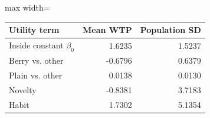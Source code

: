 \begin{adjustbox}{max width=\linewidth}
\begin{tabular}{lrr}\toprule
Utility term & Mean WTP & Population SD\\\midrule
Inside constant $\beta_0$ & 1.6235 & 1.5237 \\
Berry vs. other & -0.6796 & 0.6379 \\
Plain vs. other & 0.0138 & 0.0130 \\
Novelty & -0.8381 & 3.7183 \\
Habit & 1.7302 & 5.1354 \\
\bottomrule\end{tabular}
\end{adjustbox}

